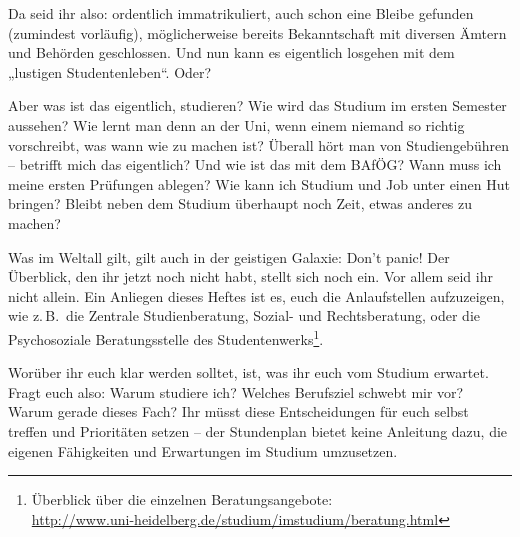 \newpage
\label{dschungel}
Da seid ihr also: ordentlich immatrikuliert, auch schon eine Bleibe gefunden (zumindest vorläufig), möglicherweise bereits Bekanntschaft mit diversen Ämtern und Behörden geschlossen. Und nun kann es eigentlich losgehen mit dem „lustigen Studentenleben“. Oder?

Aber was ist das eigentlich, studieren? Wie wird das Studium im ersten Semester aussehen? Wie lernt man denn an der Uni, wenn einem niemand so richtig vorschreibt, was wann wie zu machen ist? Überall hört man von Studiengebühren -- betrifft mich das eigentlich? Und wie ist das mit dem BAfÖG? Wann muss ich meine ersten Prüfungen ablegen? Wie kann ich Studium und Job unter einen Hut bringen? Bleibt neben dem Studium überhaupt noch Zeit, etwas anderes zu machen?

Was im Weltall gilt, gilt auch in der geistigen Galaxie: Don't panic! Der Überblick, den ihr jetzt noch nicht habt, stellt sich noch ein. Vor allem seid ihr nicht allein. Ein Anliegen dieses Heftes ist es, euch die Anlaufstellen aufzuzeigen, wie z.\,B.\ die Zentrale Studienberatung, Sozial- und Rechtsberatung, oder die Psychosoziale Beratungsstelle des Studentenwerks\footnote{Überblick über die einzelnen Beratungsangebote:\\\url{http://www.uni-heidelberg.de/studium/imstudium/beratung.html}}.

Worüber ihr euch klar werden solltet, ist, was ihr euch vom Studium erwartet. Fragt euch also: Warum studiere ich? Welches Berufsziel schwebt mir vor? Warum gerade dieses Fach? Ihr müsst diese Entscheidungen für euch selbst treffen und Prioritäten setzen -- der Stundenplan bietet keine Anleitung dazu, die eigenen Fähigkeiten und Erwartungen im Studium umzusetzen.\enlargethispage{\baselineskip}%
